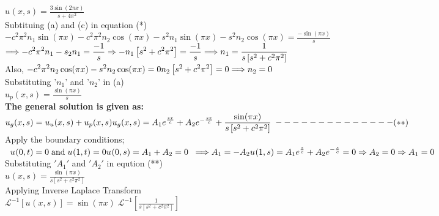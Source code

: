 \documentclass[a4paper 11pt]{article}
\newcommand{\Laplace}{\mathcal{L}}
\newcommand{\sbracket}[1]{\left[#1\right]}
\newcommand{\Un}[2]{u_{#1}(#2)}
\newcommand{\NI}{\noindent}
\newcommand{\psq}{\pi^{2}}
\newcommand{\InverseL}[1]{\Laplace^{-1}\left[#1\right]}
\begin{document}
\NI ${\displaystyle \Un{}{x,s} = \frac{3\sin(2\pi x)}{s + 4\pi^{2}}}$\\[0.5cm]

\NI Subtituing (a) and (c) in equation (*)\\
${\displaystyle -c^{2}\psq n_{1}\sin(\pi x) - c^{2}\psq n_{2}\cos(\pi x) - s^{2}n_{1}\sin(\pi x) -  s^{2}n_{2}\cos(\pi x) = \frac{-\sin(\pi x)}{s}}$\\[0.2cm]
$ \Longrightarrow \displaystyle -c^{2}\psq n_{1} - s_{2}n_{1}  = \frac{-1}{s} \Rightarrow -n_{1}\left[s^{2} + c^{2}\psq \right] = \frac{-1}{s} \\ 
\Longrightarrow n_{1} = \frac{1}{s\left[s^{2} + c^{2}\psq \right]}
$\\[0.2cm]

\NI Also, 
$
\displaystyle -c^{2}\psq n_{2}\cos(\pi x) - s^{2}n_{2}\cos(\pi x) = 0 \\[0.2cm]
n_2\left[s^{2} + c^{2}\psq \right] = 0 \\[0.2cm] 
\Longrightarrow n_{2} = 0 \\
$\\[0.2cm]

\NI Substituting '$n_{1}$' and '$n_{2}$' in (a)\\[0.2cm]
$ \displaystyle
\Un{p}{x,s} = \frac{\sin(\pi x)}{s}
$\\[0.2cm]

\NI \textbf{The general solution is given as:}\\[0.2cm]
$\displaystyle
\Un{g}{x,s} = \Un{u}{x,s} + \Un{p}{x,s} \\[0.2cm]
\Un{g}{x,s} = A_{1}e^{\frac{sx}{c}} + A_{2}e^{-\frac{sx}{c}} + \frac{\sin(\pi x)}{s\left[ s^{2} + c^{2}\psq \right]} \; - - - - - - - - - - - - - - (**)
$\\[0.2cm]

\NI Apply the boundary conditions;
$\displaystyle
\; \; \Un{}{0,t} = 0 \; \text{and} \; \Un{}{1,t} = 0 \\[0.2cm]
\Un{}{0,s} = A_1 + A_2 = 0 \; \; \Longrightarrow A_1 = - A_2 \\[0.1cm]
\Un{}{1,s} = A_1 e^{\frac{s}{c}} + A_2 e^{- \frac{s}{c}} = 0 \Rightarrow A_2 = 0 \Rightarrow A_1 = 0
$\\[0.3cm]

\NI Substituting $'A_1'$ and $'A_2'$ in eqution (**) \\[0.2cm]
$\displaystyle
\Un{}{x,s} = \frac{\sin(\pi x)}{s \left[s^{2} + c^{2}\psq \right]}
$\\[1cm]

\NI Applying Inverse Laplace Transform \\[0.2cm]
$\displaystyle
\InverseL{\Un{}{x,s}} = \sin(\pi x) \; \InverseL{\frac{1}{s\sbracket{s^{2} + c^{2}\psq}}}
$\\[0.3cm]
\end{document}
